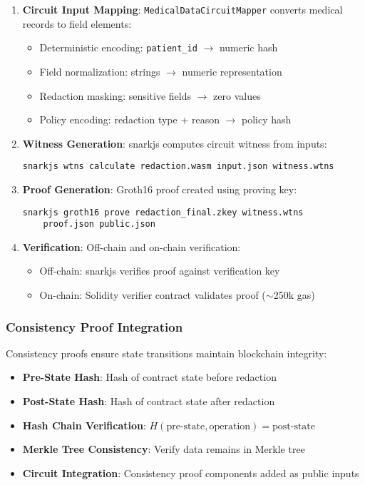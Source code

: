 \begin{enumerate}
    \item \textbf{Circuit Input Mapping}: \texttt{MedicalDataCircuitMapper} converts medical records to field elements:
    \begin{itemize}
        \item Deterministic encoding: \texttt{patient\_id} $\rightarrow$ numeric hash
        \item Field normalization: strings $\rightarrow$ numeric representation
        \item Redaction masking: sensitive fields $\rightarrow$ zero values
        \item Policy encoding: redaction type + reason $\rightarrow$ policy hash
    \end{itemize}
    
    \item \textbf{Witness Generation}: snarkjs computes circuit witness from inputs:
    \begin{verbatim}
snarkjs wtns calculate redaction.wasm input.json witness.wtns
    \end{verbatim}
    
    \item \textbf{Proof Generation}: Groth16 proof created using proving key:
    \begin{verbatim}
snarkjs groth16 prove redaction_final.zkey witness.wtns 
    proof.json public.json
    \end{verbatim}
    
    \item \textbf{Verification}: Off-chain and on-chain verification:
    \begin{itemize}
        \item Off-chain: snarkjs verifies proof against verification key
        \item On-chain: Solidity verifier contract validates proof ($\sim$250k gas)
    \end{itemize}
\end{enumerate}

\subsubsection{Consistency Proof Integration}

Consistency proofs ensure state transitions maintain blockchain integrity:

\begin{itemize}
    \item \textbf{Pre-State Hash}: Hash of contract state before redaction
    \item \textbf{Post-State Hash}: Hash of contract state after redaction
    \item \textbf{Hash Chain Verification}: $H(\text{pre-state}, \text{operation}) = \text{post-state}$
    \item \textbf{Merkle Tree Consistency}: Verify data remains in Merkle tree
    \item \textbf{Circuit Integration}: Consistency proof components added as public inputs
\end{itemize}

